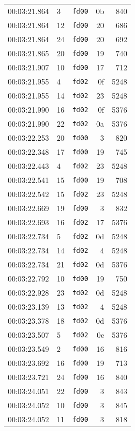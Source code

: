 \documentclass{article}
\begin{document}
\begin{longtable}{lllrr}
00:03:21.864 & 3 & \texttt{fd00} & 0b & 840 \\
00:03:21.864 & 12 & \texttt{fd00} & 20 & 686 \\
00:03:21.864 & 24 & \texttt{fd00} & 20 & 692 \\
00:03:21.865 & 20 & \texttt{fd00} & 19 & 740 \\
00:03:21.907 & 10 & \texttt{fd00} & 17 & 712 \\
00:03:21.955 & 4 & \texttt{fd02} & 0f & 5248 \\
00:03:21.955 & 14 & \texttt{fd02} & 23 & 5248 \\
00:03:21.990 & 16 & \texttt{fd02} & 0f & 5376 \\
00:03:21.990 & 22 & \texttt{fd02} & 0a & 5376 \\
00:03:22.253 & 20 & \texttt{fd00} & 3 & 820 \\
00:03:22.348 & 17 & \texttt{fd00} & 19 & 745 \\
00:03:22.443 & 4 & \texttt{fd02} & 23 & 5248 \\
00:03:22.541 & 15 & \texttt{fd00} & 19 & 708 \\
00:03:22.542 & 15 & \texttt{fd02} & 23 & 5248 \\
00:03:22.669 & 19 & \texttt{fd00} & 3 & 832 \\
00:03:22.693 & 16 & \texttt{fd02} & 17 & 5376 \\
00:03:22.734 & 5 & \texttt{fd02} & 0d & 5248 \\
00:03:22.734 & 14 & \texttt{fd02} & 4 & 5248 \\
00:03:22.734 & 21 & \texttt{fd02} & 0d & 5376 \\
00:03:22.792 & 10 & \texttt{fd00} & 19 & 750 \\
00:03:22.928 & 23 & \texttt{fd02} & 0d & 5248 \\
00:03:23.139 & 13 & \texttt{fd02} & 4 & 5248 \\
00:03:23.378 & 18 & \texttt{fd02} & 0d & 5376 \\
00:03:23.507 & 5 & \texttt{fd02} & 0e & 5376 \\
00:03:23.549 & 2 & \texttt{fd00} & 16 & 816 \\
00:03:23.692 & 16 & \texttt{fd00} & 19 & 713 \\
00:03:23.721 & 24 & \texttt{fd00} & 16 & 840 \\
00:03:24.051 & 22 & \texttt{fd00} & 3 & 843 \\
00:03:24.052 & 10 & \texttt{fd00} & 3 & 845 \\
00:03:24.052 & 11 & \texttt{fd00} & 3 & 818 \\

\end{longtable}
\end{document}

